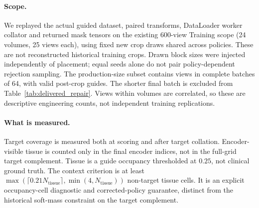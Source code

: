 \documentclass{article}
\begin{document}
\paragraph{Scope.}
We replayed the actual guided dataset, paired transforms, DataLoader worker
collator and returned mask tensors on the existing 600-view Training scope
(24 volumes, 25 views each), using fixed new crop draws shared across policies.
These are not reconstructed historical training crops. Drawn block sizes were
injected independently of placement; equal seeds alone do not pair
policy-dependent rejection sampling. The production-size subset contains
\DTFullImages{} views in complete batches of 64, with \DTValidGuides{} valid
post-crop guides. The shorter final batch is excluded from
Table~\ref{tab:delivered_repair}. Views within volumes are correlated, so these
are descriptive engineering counts, not independent training replications.

\paragraph{What is measured.}
Target coverage is measured both at scoring and after target collation.
Encoder-visible tissue is counted only in the final encoder indices, not
in the full-grid target complement. Tissue is a guide occupancy thresholded
at $0.25$, not clinical ground truth. The context criterion is at least
$\max(\lceil 0.21N_{\mathrm{tissue}}\rceil,\min(4,N_{\mathrm{tissue}}))$
non-target tissue cells. It is an explicit occupancy-cell diagnostic and
corrected-policy guarantee, distinct from the historical soft-mass constraint
on the target complement.
\end{document}
